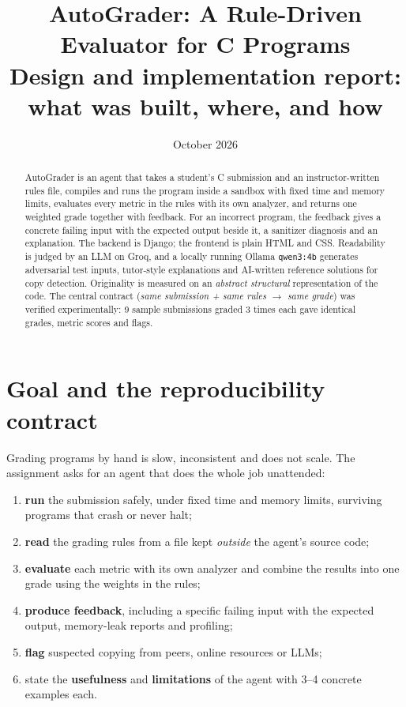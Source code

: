 \documentclass[11pt,a4paper]{article}
\title{\textbf{AutoGrader: A Rule-Driven Evaluator for C Programs}\\[4pt]
\large Design and implementation report: what was built, where, and how}
\author{}
\date{October 2026}
\begin{document}
\maketitle

\begin{abstract}
\noindent AutoGrader is an agent that takes a student's C submission and an instructor-written
rules file, compiles and runs the program inside a sandbox with fixed time and memory limits, evaluates
every metric in the rules with its own analyzer, and returns one weighted grade together with
feedback. For an incorrect program, the feedback gives a concrete failing input with the expected
output beside it, a sanitizer diagnosis and an explanation. The backend is Django; the frontend is plain
HTML and CSS. Readability is judged by an LLM on Groq, and a locally running Ollama \texttt{qwen3:4b}
generates adversarial test inputs, tutor-style explanations and AI-written reference solutions for
copy detection. Originality is measured on an \emph{abstract structural} representation of the code. The
central contract (\emph{same submission + same rules $\rightarrow$ same grade}) was verified
experimentally: 9 sample submissions graded 3 times each gave identical grades, metric scores and
flags.
\end{abstract}

\tableofcontents
\newpage

\section{Goal and the reproducibility contract}
Grading programs by hand is slow, inconsistent and does not scale. The assignment asks for an agent that
does the whole job unattended:

\begin{enumerate}
  \item \textbf{run} the submission safely, under fixed time and memory limits, surviving programs that
        crash or never halt;
  \item \textbf{read} the grading rules from a file kept \emph{outside} the agent's source code;
  \item \textbf{evaluate} each metric with its own analyzer and combine the results into one grade using
        the weights in the rules;
  \item \textbf{produce feedback}, including a specific failing input with the expected output, memory-leak
        reports and profiling;
  \item \textbf{flag} suspected copying from peers, online resources or LLMs;
  \item state the \textbf{usefulness} and \textbf{limitations} of the agent with 3--4 concrete examples each.
\end{enumerate}
\end{document}
